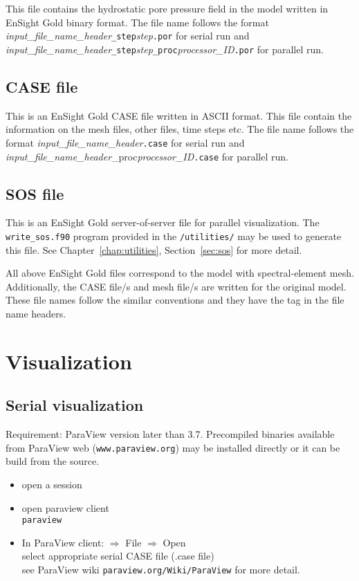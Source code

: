 This file contains the hydrostatic pore pressure field in the model written in EnSight Gold binary format. The file name follows the format \emph{input\_file\_name\_header}\texttt{\_step}\emph{step}\texttt{.por} for serial run and \emph{input\_file\_name\_header}\texttt{\_step}\emph{step}\texttt{\_proc}\emph{processor\_ID}\texttt{.por} for parallel run.

\subsection{CASE file}

This is an EnSight Gold CASE file written in ASCII format. This file contain the information on the mesh files, other files, time steps etc. The file name follows the format \emph{input\_file\_name\_header}\texttt{.case} for serial run and \emph{input\_file\_name\_header}{\_proc}\emph{processor\_ID}\texttt{.case} for parallel run.

\subsection{SOS file}

This is an EnSight Gold server-of-server file for parallel visualization. The \texttt{write\_sos.f90} program provided in the \texttt{/utilities/} may be used to generate this file. See Chapter~\ref{chap:utilities}, Section~\ref{sec:sos} for more detail.

All above EnSight Gold files correspond to the model with spectral-element mesh. Additionally, the CASE file/s and mesh file/s are written for the original model. These file names follow the similar conventions and they have the tag \texttt{} in the file name headers.

\section{Visualization}
\subsection{Serial visualization}

Requirement: ParaView version later than 3.7. Precompiled binaries available from ParaView web (\texttt{www.paraview.org}) may be installed directly or it can be build from the source.

\begin{itemize}
\item open a session
\item open paraview client \\
\texttt{paraview}
\item In ParaView client: $\Rightarrow$ File $\Rightarrow$ Open\\
   select appropriate serial CASE file (.case file)\\
   see ParaView wiki \texttt{paraview.org/Wiki/ParaView} for more detail.
\end{itemize}

